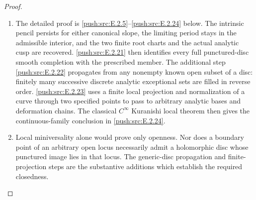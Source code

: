 \begin{proof}

\begin{enumerate}[label={$\langle1\rangle$\arabic*.},leftmargin=*]
\item The detailed proof is \ref{push:src:E.2.5}--\ref{push:src:E.2.24} below.  The intrinsic
pencil persists for either canonical slope, the limiting
period stays in the admissible interior, and the two finite
root charts and the actual analytic cusp are recovered.
\ref{push:src:E.2.21} then identifies every full punctured-disc smooth
completion with the prescribed member.  The additional
step \ref{push:src:E.2.22} propagates from any nonempty known open subset
of a disc: finitely many successive discrete analytic
exceptional sets are filled in reverse order.  \ref{push:src:E.2.23} uses
a finite local projection and normalization of a curve
through two specified points to pass to arbitrary analytic
bases and deformation chains.
The classical $C^\infty$ Kuranishi local theorem then
gives the continuous-family conclusion in \ref{push:src:E.2.24}.

\item Local miniversality alone would prove only openness.
Nor does a boundary point of an arbitrary open locus
necessarily admit a holomorphic disc whose punctured
image lies in that locus.  The generic-disc propagation
and finite-projection steps are the substantive additions
which establish the required closedness.

\end{enumerate}
\end{proof}
